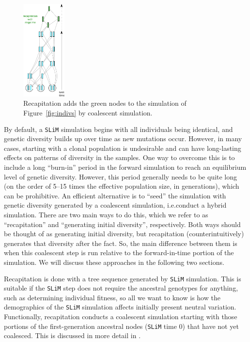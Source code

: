 \documentclass[12pt]{article}
\newcommand{\slim}[0]{\texttt{SLiM}\xspace}
\newcommand*{\ie}{i.e.\xcomma}
\begin{document}
\begin{figure}
\centering
    \includegraphics[width=0.2\textwidth]{figures/pedigree_recapitate.pdf}
\caption{
    Recapitation adds the green nodes 
    to the simulation of Figure~\ref{fig:indivs} by coalescent simulation.
}
\label{fig:recap_simp}
\end{figure}

By default, a \slim simulation begins with all individuals being identical, and genetic diversity
builds up over time as new mutations occur. However, in many cases, starting with a clonal population
is undesirable and can have long-lasting effects on patterns of diversity in the samples. One way to overcome
this is to include a long ``burn-in'' period in the forward simulation to reach an equilibrium level of genetic diversity.
However, this period generally needs to be quite long (on the order of 5--15 times the effective population size, in generations),
which can be prohibitive.
An efficient alternative is to ``seed'' the simulation with genetic diversity generated by a coalescent simulation, \ie conduct a hybrid simulation.
There are two main ways to do this, which we refer to as ``recapitation'' and ``generating initial diversity'', respectively.
Both ways should be thought of as generating initial diversity, but recapitation (counterintuitively) generates that diversity after the fact.
So, the main difference between them is when
this coalescent step is run relative to the forward-in-time portion of the simulation.
We will discuss these approaches in the following two sections.

Recapitation is done with a tree sequence generated by \slim simulation.
This is suitable if the \slim step does not require the ancestral genotypes for anything, such as determining individual fitness,
so all we want to know is how the demographics of the \slim simulation affects initially present neutral variation.
Functionally, recapitation conducts a coalescent simulation
starting with those portions of the first-generation ancestral nodes (\slim time 0) that have not yet coalesced.
This is discussed in more detail in \citet{haller_tree-sequence_2019}.
\end{document}
